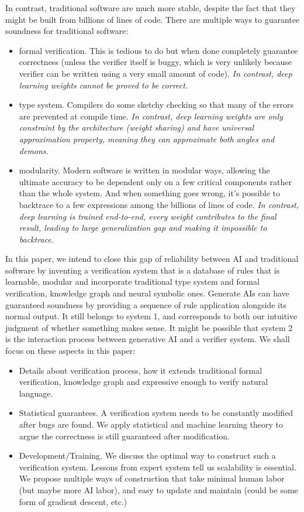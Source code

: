 \documentclass[11pt, oneside]{article}   	%
\theoremstyle{definition}
\begin{document}
In contrast, traditional software are much more stable, despite the fact that they might be built from billions of lines of code. There are multiple ways to guarantee soundness for traditional software:

\begin{itemize}
	\item formal verification. This is tedious to do but when done completely guarantee correctness (unless the verifier itself is buggy, which is very unlikely because verifier can be written using a very small amount of code). \textit{In contrast, deep learning weights cannot be proved to be correct.}
	\item type system. Compilers do some sketchy checking so that many of the errors are prevented at compile time. \textit{In contrast, deep learning weights are only constraint by the architecture (weight sharing) and have universal approximation property, meaning they can approximate both angles and demons.}
	\item modularity. Modern software is written in modular ways, allowing the ultimate accuracy to be dependent only on a few critical components rather than the whole system. And when something goes wrong, it's possible to backtrace to a few expressions among the billions of lines of code. \textit{In contrast, deep learning is trained end-to-end, every weight contributes to the final result, leading to large generalization gap and making it impossible to backtrace}.
\end{itemize}

In this paper, we intend to close this gap of reliability between AI and traditional software by inventing a verification system that is a database of rules that is learnable, modular and incorporate traditional type system and formal verification, knowledge graph and neural symbolic ones. Generate AIs can have guaranteed soundness by providing a sequence of rule application alongside its normal output. It still belongs to system 1, and corresponds to both our intuitive judgment of whether something makes sense. It might be possible that system 2 is the interaction process between generative AI and a verifier system. We shall focus on these aspects in this paper:
\begin{itemize}
	\item Details about verification process, how it extends traditional formal verification, knowledge graph and expressive enough to verify natural language.
	\item Statistical guarantees. A verification system needs to be constantly modified after bugs are found. We apply statistical and machine learning theory to argue the correctness is still guaranteed after modification.
	\item Development/Training. We discuss the optimal way to construct such a verification system. Lessons from expert system tell us scalability is essential. We propose multiple ways of construction that take minimal human labor (but maybe more AI labor), and easy to update and maintain (could be some form of gradient descent, etc.)
\end{itemize}
\end{document}
